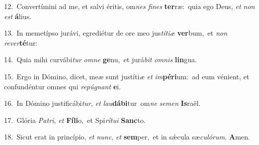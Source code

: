 {\numbfont\textcolor{\numbcolor}{12.}}~Convertímini ad me, et salvi éritis, om\textit{nes} \textit{fi}\-\textit{nes} \textbf{ter}\-ræ:~\star quia ego Deus, \textit{et} \textit{non} \textit{est} \textbf{á}\-lius.\par
{\numbfont\textcolor{\numbcolor}{13.}}~In memetípso jurávi, egrediétur de ore meo jus\-\textit{tí}\-\textit{ti}\textit{æ} \textbf{ver}\-bum,~\star et \textit{non} \textit{re}\-\textit{ver}\textbf{té}tur:\par
{\numbfont\textcolor{\numbcolor}{14.}}~Quia mihi curvábi\textit{tur} \textit{om}\-\textit{ne} \textbf{ge}\-nu,~\star et jurá\textit{bit} \textit{om}\-\textit{nis} \textbf{lin}\-gua.\par
{\numbfont\textcolor{\numbcolor}{15.}}~Ergo in Dómino, dicet, meæ sunt justíti\textit{æ} \textit{et} \textit{im}\-\textbf{pé}\textbf{ri}um:~\star ad eum vénient, et confundéntur omnes qui \textit{re}\-\textit{pú}\textit{gnant} \textbf{e}\-i.\par
{\numbfont\textcolor{\numbcolor}{16.}}~In Dómino justificábi\-\textit{tur}\-, \textit{et} \textit{lau}\-\textbf{dá}\textbf{bi}tur~\star om\textit{ne} \textit{se}\-\textit{men} \textbf{Is}\-raël.\par
{\numbfont\textcolor{\numbcolor}{17.}}~Glória \textit{Pa}\-\textit{tri}, \textit{et} \textbf{Fí}\-\textbf{li}o,~\star et Spi\-\textit{rí}\-\textit{tu}\textit{i} \textbf{Sanc}\-to.\par
{\numbfont\textcolor{\numbcolor}{18.}}~Sicut erat in princípio, \textit{et} \textit{nunc}\-, \textit{et} \textbf{sem}\-per,~\star et in sǽcula sæ\-\textit{cu}\-\textit{ló}\textit{rum}. \textbf{A}\-men.\par
